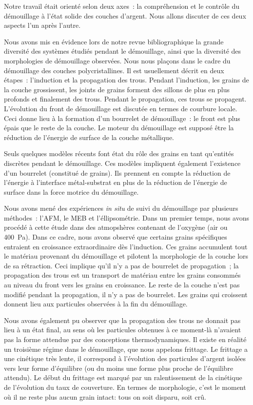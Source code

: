 Notre travail était orienté selon deux axes~: la compréhension et le contrôle du démouillage à l'état solide des couches d'argent. Nous allons discuter de ces deux aspects l'un après l'autre.\par 
Nous avons mis en évidence lors de notre revue bibliographique la grande diversité des systèmes étudiés pendant le démouillage, ainsi que la diversité des morphologies de démouillage observées. Nous nous plaçons dans le cadre du démouillage des couches polycristallines. Il est usuellement décrit en deux étapes~: l'induction et la propagation des trous. Pendant l'induction, les grains de la couche grossissent, les joints de grains forment des sillons de plus en plus profonds et finalement des trous. Pendant le propagation, ces trous se propagent. L'évolution du front de démouillage est discutée en termes de courbure locale. Ceci donne lieu à la formation d'un bourrelet de démouillage~: le front est plus épais que le reste de la couche. Le moteur du démouillage est supposé être la réduction de l'énergie de surface de la couche métallique.\par 
Seuls quelques modèles récents font état du rôle des grains en tant qu'entités discrètes pendant le démouillage. Ces modèles impliquent également l'existence d'un bourrelet (constitué de grains). Ils prennent en compte la réduction de l'énergie à l'interface métal-substrat en plus de la réduction de l'énergie de surface dans la force motrice du démouillage.\par 
Nous avons mené des expériences \textit{in situ} de suivi du démouillage par plusieurs méthodes~: l'AFM, le MEB et l'éllipsométrie. Dans un premier temps, nous avons procédé à cette étude dans des atmopshères contenant de l'oxygène (air ou 400~Pa). Dans ce cadre, nous avons observé que certains grains spécifiques entraient en croissance extraordinaire dès l'induction. Ces grains accumulent tout le matériau provenant du démouillage et pilotent la morphologie de la couche lors de sa rétraction. Ceci implique qu'il n'y a pas de bourrelet de propagation~; la propagation des trous est un transport de matériau entre les grains consommés au niveau du front vers les grains en croissance. Le reste de la couche n'est pas modifié pendant la propagation, il n'y a pas de bourrelet. Les grains qui croissent donnent lieu aux particules observées à la fin du démouillage.\par 
Nous avons également pu observer que la propagation des trous ne donnait pas lieu à un état final, au sens où les particules obtenues à ce moment-là n'avaient pas la forme attendue par des conceptions thermodynamiques. Il existe en réalité un troisième régime dans le démouillage, que nous appelons frittage. Le frittage a une cinétique très lente, il correspond à l'évolution des particules d'argent isolées vers leur forme d'équilibre (ou du moins une forme plus proche de l'équilibre attendu). Le début du frittage est marqué par un ralentissement de la cinétique de l'évolution du taux de couverture. En termes de morphologie, c'est le moment où il ne reste plus aucun grain \og intact\fg{}: tous on soit disparu, soit crû. \par 
